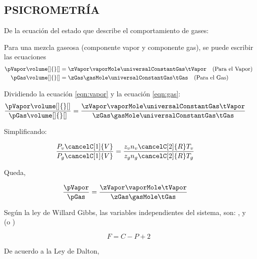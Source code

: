 \subsection{PSICROMETRÍA}

De la ecuación del estado que describe el comportamiento de gases:
\eqEosWithZ

Para una mezcla gaseosa (componente  vapor y componente gas), se puede escribir las ecuaciones
\begin{subequations}
    \label{eqn:every_component_mixture_of_gases} %
    \begin{align}
        {\pVapor}{\volume[]{}[]} &= {\zVapor}{\vaporMole}{\universalConstantGas}{\tVapor}  \quad \text{(Para el Vapor)} \label{eqn:vapor} \\
        {\pGas}{\volume[]{}[]}   &= {\zGas}{\gasMole}{\universalConstantGas}{\tGas}  \quad \text{(Para el Gas)} \label{eqn:gas}
    \end{align}
\end{subequations}

Dividiendo la ecuación \eqref{eqn:vapor} y la ecuación \eqref{eqn:gas}:
\begin{align}
    \frac{{\pVapor}{\volume[]{}[]}}{{\pGas}{\volume[]{}[]}} &= \frac{{\zVapor}{\vaporMole}{\universalConstantGas}{\tVapor}}{{\zGas}{\gasMole}{\universalConstantGas}{\tGas}}
\end{align}

Simplificando:

\begin{align}
    \frac{P_v \cancelC[1]{V}}{P_g \cancelC[1]{V}} &= \frac{z_v n_v \cancelC[2]{R} T_v}{z_g n_g \cancelC[2]{R} T_g}
\end{align}

Queda,

\begin{align}
    \frac{\pVapor}{\pGas} &= \frac{\zVapor \vaporMole \tVapor}{\zGas \gasMole \tGas}
\end{align}

Según la ley de Willard Gibbs, las variables independientes del sistema, son: \pTotal , \temperature[]{} y \pVapor (o \vaporMoleFraction)

\begin{equation}
    F = C - P + 2
\end{equation}

De acuerdo a la Ley de Dalton,

